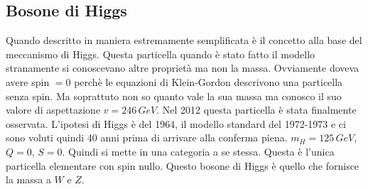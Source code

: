 \subsection{Bosone di Higgs}
Quando descritto in maniera estremamente semplificata è il concetto alla base del meccanismo di Higgs. Questa particella quando è stato fatto il modello stranamente si conoscevano altre proprietà ma non la massa. Ovviamente doveva avere spin $=0$ perchè le equazioni di Klein-Gordon descrivono una particella senza spin. Ma soprattuto non so quanto vale la sua massa ma conosco il suo valore di aspettazione $v=246\,GeV$. Nel 2012 questa particella è stata finalmente osservata. L'ipotesi di Higgs è del 1964, il modello standard del 1972-1973 e ci sono voluti quindi 40 anni prima di arrivare alla conferma piena. $m_H=125\,GeV$, $Q=0$, $S=0$. Quindi si mette in una categoria a se stessa. Questa è l'unica particella elementare con spin nullo. Questo bosone di Higgs è quello che fornisce la massa a $W$ e $Z$.